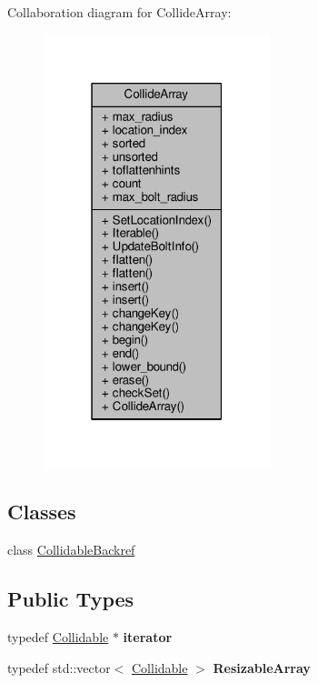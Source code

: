 Collaboration diagram for Collide\+Array\+:
\nopagebreak
\begin{figure}[H]
\begin{center}
\leavevmode
\includegraphics[width=187pt]{df/dab/classCollideArray__coll__graph}
\end{center}
\end{figure}
\subsection*{Classes}
\begin{DoxyCompactItemize}
\item 
class \hyperlink{classCollideArray_1_1CollidableBackref}{Collidable\+Backref}
\end{DoxyCompactItemize}
\subsection*{Public Types}
\begin{DoxyCompactItemize}
\item 
typedef \hyperlink{classCollidable}{Collidable} $\ast$ {\bfseries iterator}\hypertarget{classCollideArray_abccaa5060a5edc674f8060e72d8d5f78}{}\label{classCollideArray_abccaa5060a5edc674f8060e72d8d5f78}

\item 
typedef std\+::vector$<$ \hyperlink{classCollidable}{Collidable} $>$ {\bfseries Resizable\+Array}\hypertarget{classCollideArray_a051a3c662716abd72d57098308a7bf62}{}\label{classCollideArray_a051a3c662716abd72d57098308a7bf62}

\end{DoxyCompactItemize}

